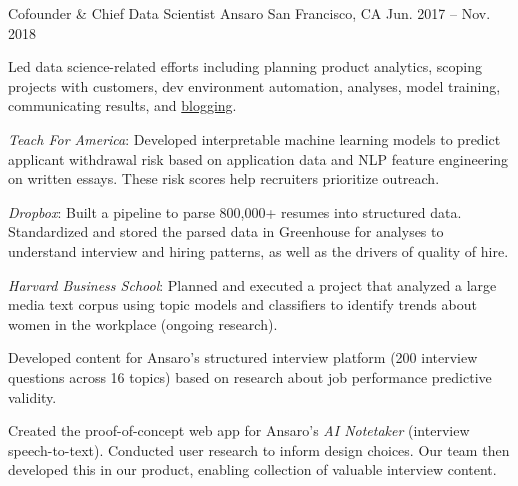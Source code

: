 \begin{cventries}
  \cventry
    {Cofounder \& Chief Data Scientist} %
    {Ansaro} %
    {San Francisco, CA} %
    {Jun. 2017 -- Nov. 2018} %
    {
      \begin{cvitems} %
        \item {Led data science-related efforts including planning product analytics, scoping projects with customers, dev environment automation, analyses, model training, communicating results, and {\href{https://medium.com/ansaro-blog}{blogging}}.}
        \item {\textit{Teach For America}: Developed interpretable machine learning models to predict applicant withdrawal risk based on application data and NLP feature engineering on written essays. These risk scores help recruiters prioritize outreach.}
        \item {\textit{Dropbox}: Built a pipeline to parse 800,000+ resumes into structured data. Standardized and stored the parsed data in Greenhouse for analyses to understand interview and hiring patterns, as well as the drivers of quality of hire.}
        \item {\textit{Harvard Business School}: Planned and executed a project that analyzed a large media text corpus using topic models and classifiers to identify trends about women in the workplace (ongoing research).}
        \item {Developed content for Ansaro's structured interview platform (200 interview questions across 16 topics) based on research about job performance predictive validity.} %
        \item {Created the proof-of-concept web app for Ansaro's \textit{AI Notetaker} (interview speech-to-text). Conducted user research to inform design choices. Our team then developed this in our product, enabling collection of valuable interview content.}
      \end{cvitems}
    }


\end{cventries}
